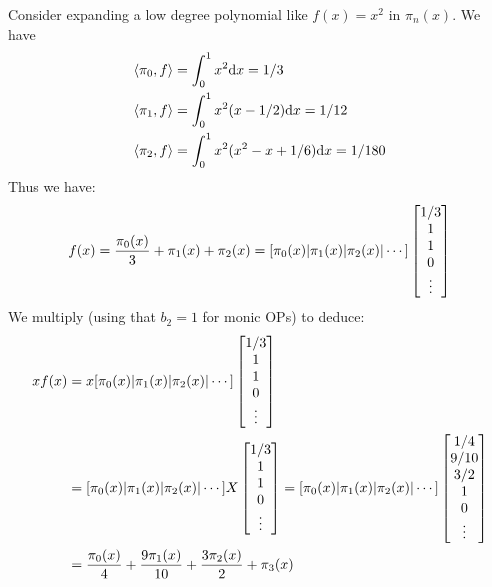 \begin{example}[expansion] Consider expanding a low degree polynomial like $f(x) = x^2$ in $\ensuremath{\pi}_n(x)$. We have
\begin{align*}
\ensuremath{\langle}\ensuremath{\pi}_0, f\ensuremath{\rangle} &= \ensuremath{\int}_0^1 x^2 {\rm d} x = 1/3 \\
\ensuremath{\langle}\ensuremath{\pi}_1, f\ensuremath{\rangle} &= \ensuremath{\int}_0^1 x^2 (x - 1/2) {\rm d} x = 1/12 \\
\ensuremath{\langle}\ensuremath{\pi}_2, f\ensuremath{\rangle} &= \ensuremath{\int}_0^1 x^2 (x^2 - x + 1/6) {\rm d} x = 1/180
\end{align*}
Thus we have:
\[
f(x) = {\ensuremath{\pi}_0(x) \over 3} + \ensuremath{\pi}_1(x) + \ensuremath{\pi}_2(x) = [\ensuremath{\pi}_0(x) | \ensuremath{\pi}_1(x) | \ensuremath{\pi}_2(x) | \ensuremath{\cdots}] \begin{bmatrix} 1/3 \\ 1 \\ 1 \\ 0 \\ \ensuremath{\vdots} \end{bmatrix}
\]
We multiply (using that $b_2 = 1$ for monic OPs) to deduce:
\begin{align*}
x f(x) &= x[\ensuremath{\pi}_0(x) | \ensuremath{\pi}_1(x) | \ensuremath{\pi}_2(x) | \ensuremath{\cdots}] \begin{bmatrix} 1/3 \\ 1 \\ 1 \\ 0 \\ \ensuremath{\vdots} \end{bmatrix} \\
&= [\ensuremath{\pi}_0(x) | \ensuremath{\pi}_1(x) | \ensuremath{\pi}_2(x) | \ensuremath{\cdots}] X \begin{bmatrix} 1/3 \\ 1 \\ 1 \\ 0 \\ \ensuremath{\vdots} \end{bmatrix}
= [\ensuremath{\pi}_0(x) | \ensuremath{\pi}_1(x) | \ensuremath{\pi}_2(x) | \ensuremath{\cdots}]  \begin{bmatrix} 1/4 \\ 9/10 \\ 3/2 \\ 1 \\ 0 \\ \ensuremath{\vdots} \end{bmatrix} \\
&= {\ensuremath{\pi}_0(x) \over 4} + {9 \ensuremath{\pi}_1(x) \over 10} + {3 \ensuremath{\pi}_2(x) \over 2} + \ensuremath{\pi}_3(x)
\end{align*}
\end{example}



